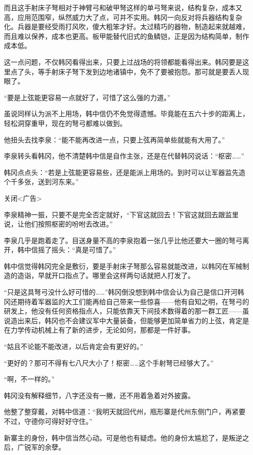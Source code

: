 而且这手射床子弩相对于神臂弓和破甲弩这样的单弓弩来说，结构复杂，成本又高，应用范围窄，纵然威力大了点，可并不实用。韩冈一向反对将兵器结构复杂化。兵器是要经受雨打风吹，傻大粗笨才好。太过精巧的器物，制造起来就越难，而且难以保养，成本也更高。板甲能替代旧式的鱼鳞铠，正是因为结构简单，制作成本低。

这一点问题，不仅韩冈看得出来，只要上过战场的将领都能看得出来。韩冈要是这里点了头，等手射床子弩下发到边地诸镇中，免不了要被抱怨。那可就是要丢人现眼了。

“要是上弦能更容易一点就好了，可惜了这么强的力道。”

虽说同样认为派不上用场，韩中信仍不免觉得遗憾。毕竟能在五六十步的距离上，轻松洞穿重甲，现在的弩弓都难以做到。

他扭头去找李泉：“能不能再改进一点，只要上弦再简单些就能有大用了。”

李泉转头看韩冈，他不清楚韩中信是自作主张，还是在代替韩冈说话：“枢密……”

韩冈点点头：“若是上弦能更容易些，还是能派上用场的。到时可以让军器监先造个千多张，送到河东来。”

关闭<广告>

李泉精神一振，只要不是完全否定就好，“下官这就回去！下官这就回去跟监里说，让他们按照枢密的吩咐去改进。”

李泉几乎是跑着走了。目送身量不高的李泉抱着一张几乎比他还要大一圈的弩弓离开，韩中信摇了摇头：“真是可惜了。”

韩中信觉得韩冈完全是敷衍，要是手射床子弩那么容易就能改进，以韩冈在军械制造的造诣，早就开口指点了。哪里会这样两句话就把人打发了。

“只是这具弩弓没什么好可惜的……”韩冈倒没想到韩中信会认为自己是信口开河韩冈还期待着军器监的大工们能再给自己带来一些惊喜——他有自知之明，在弩弓的研发上，他没有任何资格指点人，只能依靠天下间技术数得着的那一群工匠——虽说造出来后，韩冈也不会建议军中大量装备，但能够更加简单省力的上弦，肯定是在力学传动机械上有了新的进步，无论如何，那都是一件好事。

“姑且不论能不能改进，以后肯定会有更好的。”

“更好的？那可不得有七八尺大小了！枢密……这个手射弩已经够大了。”

“啊，不一样的。”

韩冈没有解释细节，八字还没有一撇，还不用着急着对外披露。

他整了整穿戴，对韩中信道：“我明天就回代州，瓶形寨是代州东侧门户，再紧要不过，守德你可得好好守住。”

新寨主的身份，韩中信当然心动。可是他也有疑虑。他的身份太尴尬了，是叛逆之后，广锐军的余孽。


